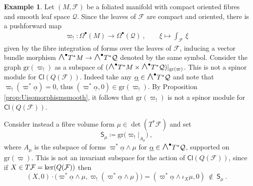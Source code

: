 \documentclass[a4paper, reqno, 11pt]{amsart}
\numberwithin{equation}{section}
\theoremstyle{definition}
\newtheorem{example}[equation]{Example}
\newcommand{\red}[1]{\underline{#1}}
\newcommand{\Cl}{\mathsf{Cl}}
\newcommand{\cQ}{{\mathcal Q}}
\newcommand{\cF}{{\mathcal F}}
\newcommand{\sfS}{{\mathsf{S}}}
\newcommand{\sfOmega}{{\mathsf{\Omega}}}
\newcommand{\midwedge}{\text {\Large$\wedge$}}
\newcommand{\gr}{\text{gr}}
\theoremstyle{remark}
\begin{document}
\begin{example}\label{ex:Qfibreintegration}
    Let $(M,\cF)$ be a foliated manifold with compact oriented fibres and smooth leaf space $\cQ$. Since the leaves of $\cF$ are compact and oriented, there is a pushforward map
    \begin{align}
        \varpi_! \colon \sfOmega^\bullet(M) \longrightarrow \sfOmega^\bullet(\cQ) \ , \qquad
        \xi\longmapsto \int_{\cF}\, \xi
    \end{align}
    given by the fibre integration of forms over the leaves of  $\cF$, inducing a vector bundle morphism $\midwedge^\bullet T^*M \to \midwedge^\bullet T^*\cQ$ denoted by the same symbol. Consider the graph $\gr(\varpi_!)$ as a subspace of $(\midwedge^\bullet T^*M \times \midwedge^\bullet T^* \cQ)|_{\gr(\varpi)}$. This is not a spinor module for $\Cl(Q(\cF))$. Indeed take any $\red\alpha \in \midwedge^\bullet T^* \cQ$ and note that $\varpi_! (\varpi^*\red\alpha) = 0$, thus $(\varpi^*\red\alpha,0) \in \gr(\varpi_!)$. By Proposition \ref{prop:Uisomorphismsmooth}, it follows that $\gr(\varpi_!)$ is not a spinor module for $\Cl(Q(\cF))$.

    Consider instead a fibre volume form $\mu \in \det(T^*\cF)$ and set $$\sfS_\mu \coloneqq \gr\big(\varpi_!\big|_{A_\mu}\big) \ , $$ where $A_\mu $ is the subspace of forms $ \varpi^* \red\alpha \wedge\mu $ for $ \red\alpha\in \midwedge^\bullet T^*\cQ$, supported on $\gr(\varpi)$. This is not an invariant subspace for the action of $\Cl(Q(\cF))$, since if $X \in T\cF = {\rm ker}(Q(\cF))$ then $$(X,0) \cdot \big(\varpi^*\red\alpha \wedge \mu, \varpi_!(\varpi^* \red\alpha \wedge \mu)\big) = (\varpi^* \red\alpha \wedge \iota_X \mu, 0) \ \notin \ \sfS_\mu \ . $$ 
    

\end{example}
\end{document}

